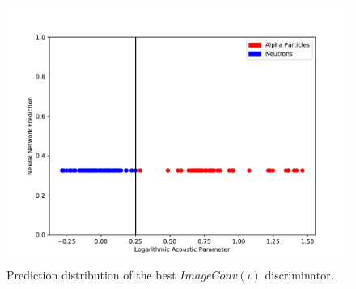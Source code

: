 \documentclass[10pt]{article}
\begin{document}
\begin{figure}[h]
    \centering
    \includegraphics[width=\textwidth]{image_hist}
    \caption{\label{image_hist} Prediction distribution of the best $ImageConv(\iota)$ discriminator.}
\end{figure}
\end{document}
